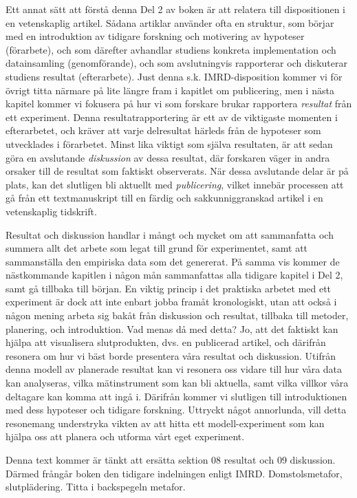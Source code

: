 \documentclass[
]{book}
\begin{document}
Ett annat sätt att förstå denna Del 2 av boken är att relatera till dispositionen i en vetenskaplig artikel. Sådana artiklar använder ofta en struktur, som börjar med en introduktion av tidigare forskning och motivering av hypoteser (förarbete), och som därefter avhandlar studiens konkreta implementation och datainsamling (genomförande), och som avslutningvis rapporterar och diskuterar studiens resultat (efterarbete). Just denna s.k. IMRD-disposition kommer vi för övrigt titta närmare på lite längre fram i kapitlet om publicering, men i nästa kapitel kommer vi fokusera på hur vi som forskare brukar rapportera \emph{resultat} från ett experiment. Denna resultatrapportering är ett av de viktigaste momenten i efterarbetet, och kräver att varje delresultat härleds från de hypoteser som utvecklades i förarbetet. Minst lika viktigt som själva resultaten, är att sedan göra en avslutande \emph{diskussion} av dessa resultat, där forskaren väger in andra orsaker till de resultat som faktiskt observerats. När dessa avslutande delar är på plats, kan det slutligen bli aktuellt med \emph{publicering}, vilket innebär processen att gå från ett textmanuskript till en färdig och sakkunniggranskad artikel i en vetenskaplig tidskrift.

Resultat och diskussion handlar i mångt och mycket om att sammanfatta och summera allt det arbete som legat till grund för experimentet, samt att sammanställa den empiriska data som det genererat. På samma vis kommer de nästkommande kapitlen i någon mån sammanfattas alla tidigare kapitel i Del 2, samt gå tillbaka till början. En viktig princip i det praktiska arbetet med ett experiment är dock att inte enbart jobba framåt kronologiskt, utan att också i någon mening arbeta sig bakåt från diskussion och resultat, tillbaka till metoder, planering, och introduktion. Vad menas då med detta? Jo, att det faktiskt kan hjälpa att visualisera slutprodukten, dvs. en publicerad artikel, och därifrån resonera om hur vi bäst borde presentera våra resultat och diskussion. Utifrån denna modell av planerade resultat kan vi resonera oss vidare till hur våra data kan analyseras, vilka mätinstrument som kan bli aktuella, samt vilka villkor våra deltagare kan komma att ingå i. Därifrån kommer vi slutligen till introduktionen med dess hypoteser och tidigare forskning. Uttryckt något annorlunda, vill detta resonemang understryka vikten av att hitta ett modell-experiment som kan hjälpa oss att planera och utforma vårt eget experiment.

Denna text kommer är tänkt att ersätta sektion 08 resultat och 09 diskussion. Därmed frångår boken den tidigare indelningen enligt IMRD. Domstolsmetafor, slutplädering. Titta i backspegeln metafor.
\end{document}
